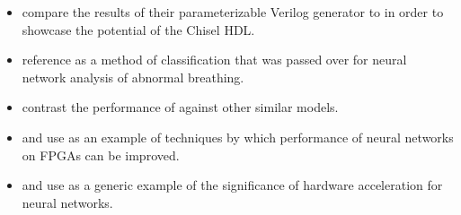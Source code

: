 \documentclass[12pt,letterpaper,english]{article}
\newcommand{\citework}[1]{\citeauthor{#1} \autocite{#1}}
\newcommand{\citeworks}[2]{%
	\citeauthor*{#1} \autocite{#1} and \citeauthor*{#2} \autocite{#2}
}
\begin{document}
\begin{itemize}
	\item \citework{madineni2023parameterizable} compare the results of their
	parameterizable Verilog generator to  in order to showcase
	the potential of the Chisel HDL.
	\item \citework{baedorf2023reverse} reference  as a method
	of classification that was passed over for neural network analysis of
	abnormal breathing.
	\item \citework{phipps2023pre} contrast the performance of 
	against other similar models.
	\item \citeworks{pistellato2023quantization}{yan2023end} use
	 as an example of techniques by which performance of neural
	networks on FPGAs can be improved.
	\item \citeworks{aydin2023fpga}{naufal2023comparative} use 
	as a generic example of the significance of hardware acceleration for neural
	networks.
\end{itemize}


\newpage
\printbibliography
\end{document}
